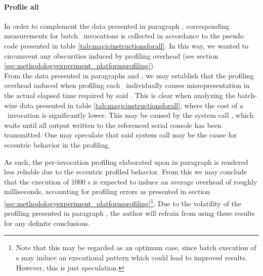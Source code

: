 

\paragraph{Profile all}
\label{par:results_magicinstructionoverhead_profileall}
In order to complement the data presented in paragraph , corresponding measurements for batch \dvttermmagicinstruction\ invocations is collected in accordance to the pseudo code presented in table \ref{tab:magicinstructionsforall}.
In this way, we wanted to circumvent any obscurities induced by profiling overhead (see section \ref{sec:methodologyexperiment_platformprofiling}).\\



\noindent
From the data presented in paragraphs  and , we may establish that the profiling overhead induced when profiling each \dvttermmagicinstruction\ individually causes misrepresentation in the actual elapsed time required by said \dvttermmagicinstruction .
This is clear when analyzing the batch-wize data presented in table \ref{tab:magicinstructionsforall}, where the cost of a \dvttermmagicinstruction\ invocation is significantly lower.
This may be caused by the system call , which	waits until all output written to the referenced serial console has been transmitted.
One may speculate that said system call may be the cause for eccentric behavior in the profiling.

As such, the per-invocation profiling elaborated upon in paragraph  is rendered less reliable due to the eccentric profiled behavior.
From this we may conclude that the execution of $1000$ \dvttermmagicinstruction s is expected to induce an average overhead of roughly  milliseconds, accounting for profiling errors as presented in section \ref{sec:methodologyexperiment_platformprofiling}\footnote{Note that this may be regarded as an optimum case, since batch execution of \dvttermmagicinstruction s may induce an executional pattern which could lead to improved results. However, this is just speculation.}.
Due to the volatility of the profiling presented in paragraph , the author will refrain from using these results for any definite conclusions.
